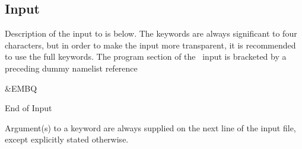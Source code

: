 \subsection{Input}
\label{UG:sec:embq_input}
Description of the input to  is below. The keywords
are always significant to four characters, but in order to make the
input more transparent, it is recommended to use the full keywords.
The  program section of the \molcas\ input is bracketed by
a preceding dummy namelist reference
\begin{inputlisting}
 &EMBQ
\end{inputlisting}
\begin{inputlisting}
End of Input
\end{inputlisting}
Argument(s) to a keyword are always supplied on the next line of the
input file, except explicitly stated otherwise.

